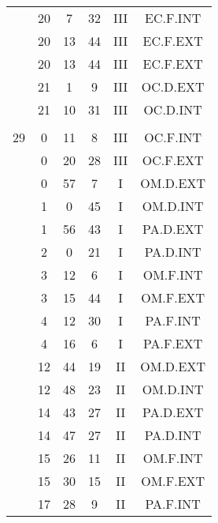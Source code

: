 \documentclass[12pt, a4paper]{article}
\begin{document}
\begin{multicols}{3}
{\begin{tabular}{c c c c c c}
	 	 	 	 & 20 & 7 & 32 & III & EC.F.INT\\%
	 	 	 	 & 20 & 13 & 44 & III & EC.F.EXT\\%
	 	 	 	 & 20 & 13 & 44 & III & EC.F.EXT\\%
	 	 	 	 & 21 & 1 & 9 & III & OC.D.EXT\\%
	 	 	 	 & 21 & 10 & 31 & III & OC.D.INT\\%
	 	 	 	 & & & & & \\%
	 	 	 	29 & 0 & 11 & 8 & III & OC.F.INT\\%
	 	 	 	 & 0 & 20 & 28 & III & OC.F.EXT\\%
	 	 	 	 & 0 & 57 & 7 & I & OM.D.EXT\\%
	 	 	 	 & 1 & 0 & 45 & I & OM.D.INT\\%
	 	 	 	 & 1 & 56 & 43 & I & PA.D.EXT\\%
	 	 	 	 & 2 & 0 & 21 & I & PA.D.INT\\%
	 	 	 	 & 3 & 12 & 6 & I & OM.F.INT\\%
	 	 	 	 & 3 & 15 & 44 & I & OM.F.EXT\\%
	 	 	 	 & 4 & 12 & 30 & I & PA.F.INT\\%
	 	 	 	 & 4 & 16 & 6 & I & PA.F.EXT\\%
	 	 	 	 & 12 & 44 & 19 & II & OM.D.EXT\\%
	 	 	 	 & 12 & 48 & 23 & II & OM.D.INT\\%
	 	 	 	 & 14 & 43 & 27 & II & PA.D.EXT\\%
	 	 	 	 & 14 & 47 & 27 & II & PA.D.INT\\%
	 	 	 	 & 15 & 26 & 11 & II & OM.F.INT\\%
	 	 	 	 & 15 & 30 & 15 & II & OM.F.EXT\\%
	 	 	 	 & 17 & 28 & 9 & II & PA.F.INT\\%

\end{tabular}}
\end{multicols}
\end{document}

